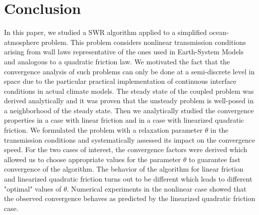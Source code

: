 \section{Conclusion}
In this paper, we studied a SWR %
algorithm applied
to a simplified ocean-atmosphere problem. 
This problem considers nonlinear transmission conditions arising 
from wall laws representative of the ones used in Earth-System Models
and analogous to a quadratic friction law. We 
motivated the fact that the convergence analysis of such 
problems can only be done at a semi-discrete level in space due to the particular practical implementation of continuous interface conditions in actual climate models.  
The steady state of the coupled problem was derived analytically
and it was proven that the unsteady problem is well-posed
in a neighborhood of the steady state.
Then we analytically studied the convergence properties in a
case with linear friction and in a case with linearized 
quadratic friction. We formulated the problem with a 
relaxation parameter $\theta$ in the transmission conditions and 
systematically assessed its impact on the convergence speed. 
%
%
%
%
For the two cases of interest, the convergence factors were derived
which allowed us to choose appropriate values
for the parameter $\theta$ to guarantee fast convergence of the algorithm.
%
The behavior of the algorithm for linear friction and linearized 
quadratic friction turns out to be different which leads to different
"optimal" values of $\theta$. 
%
%
Numerical experiments in the nonlinear case showed that the observed 
convergence behaves as predicted by the linearized quadratic friction
case.
